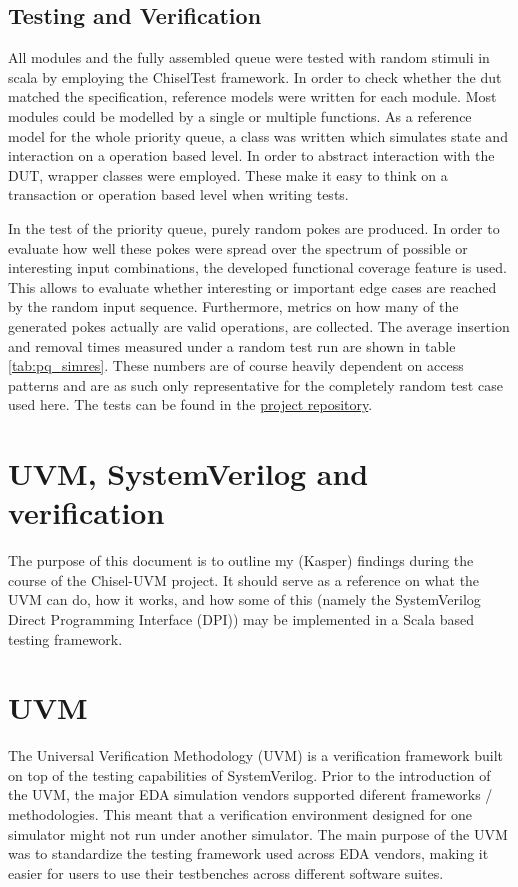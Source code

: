 \documentclass[conference]{IEEEtran}
\begin{document}
\subsection{Testing and Verification}

All modules and the fully assembled queue were tested with random stimuli in scala by employing the ChiselTest framework.
In order to check whether the dut matched the specification, reference models were written for each module. Most modules 
could be modelled by a single or multiple functions. As a reference model for the whole priority queue, a class 
was written which simulates state and interaction on a operation based level. In order to abstract interaction with the DUT,
wrapper classes were employed. These make it easy to think on a transaction or 
operation based level when writing tests.

In the test of the priority queue, purely random pokes are produced. In order to evaluate how well these pokes were spread over the spectrum 
of possible or interesting input combinations, the developed functional coverage feature is used. This allows to evaluate whether interesting 
or important edge cases are reached by the random input sequence. Furthermore, metrics on how many of the generated pokes actually are valid 
operations, are collected. The average insertion and removal times measured under a random test run are shown in table \ref{tab:pq_simres}.
These numbers are of course heavily dependent on access patterns and are as such only representative for the completely random test case used here.
The tests can be found in the \href{https://github.com/chisel-uvm/chisel-verify/tree/master/src/test/scala/heappriorityqueue}{project repository}.


\section{UVM, SystemVerilog and verification}
The purpose of this document is to outline my (Kasper) findings during the course of the Chisel-UVM project. It should serve as a reference on what the UVM can do, how it works, and how some of this (namely the SystemVerilog Direct Programming Interface (DPI)) may be implemented in a Scala based testing framework.

\section{UVM}
The Universal Verification Methodology (UVM) is a verification framework built on top of the testing capabilities of SystemVerilog. Prior to the introduction of the UVM, the major EDA simulation vendors supported diferent frameworks / methodologies. This meant that a verification environment designed for one simulator might not run under another simulator. The main purpose of the UVM was to standardize the testing framework used across EDA vendors, making it easier for users to use their testbenches across different software suites.
\end{document}
